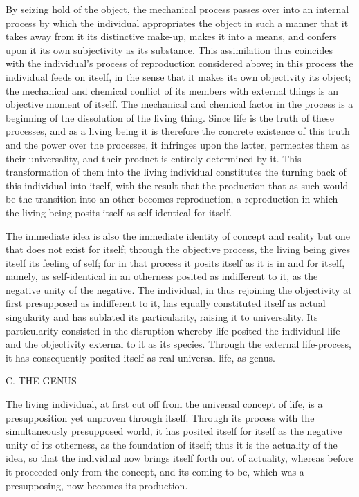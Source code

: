 By seizing hold of the object,
the mechanical process passes over into an internal process
by which the individual appropriates the object
in such a manner that it takes away from it
its distinctive make-up, makes it into a means,
and confers upon it its own subjectivity as its substance.
This assimilation thus coincides with
the individual's process of reproduction considered above;
in this process the individual feeds on itself,
in the sense that it makes its own objectivity its object;
the mechanical and chemical conflict of its members
with external things is an objective moment of itself.
The mechanical and chemical factor in the process is
a beginning of the dissolution of the living thing.
Since life is the truth of these processes,
and as a living being it is therefore
the concrete existence of this truth
and the power over the processes,
it infringes upon the latter,
permeates them as their universality,
and their product is entirely determined by it.
This transformation of them into the living individual
constitutes the turning back of this individual into itself,
with the result that the production that
as such would be the transition into an other becomes reproduction,
a reproduction in which the living being posits itself
as self-identical for itself.

The immediate idea is also
the immediate identity of concept and reality
but one that does not exist for itself;
through the objective process,
the living being gives itself its feeling of self;
for in that process it posits itself
as it is in and for itself, namely,
as self-identical in an otherness
posited as indifferent to it,
as the negative unity of the negative.
The individual, in thus rejoining the objectivity
at first presupposed as indifferent to it,
has equally constituted itself as actual singularity
and has sublated its particularity,
raising it to universality.
Its particularity consisted in the disruption
whereby life posited the individual life
and the objectivity external to it as its species.
Through the external life-process,
it has consequently posited itself
as real universal life, as genus.

C. THE GENUS

The living individual, at first cut off
from the universal concept of life,
is a presupposition yet unproven through itself.
Through its process with
the simultaneously presupposed world,
it has posited itself for itself as
the negative unity of its otherness,
as the foundation of itself;
thus it is the actuality of the idea,
so that the individual now brings
itself forth out of actuality,
whereas before it proceeded
only from the concept,
and its coming to be,
which was a presupposing,
now becomes its production.

